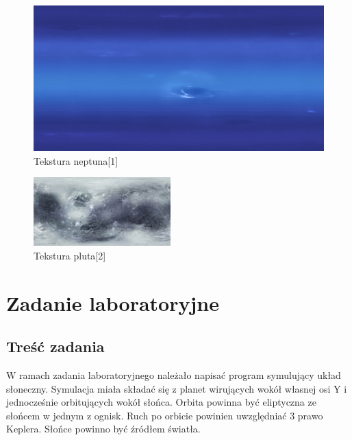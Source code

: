 \documentclass{article}
\begin{document}
        \FloatBarrier
        \begin{figure}[ht]
            \centering
            \includegraphics[width=\textwidth]{images/2k_neptune.jpg}
            \caption{Tekstura neptuna[1]}
            \label{fig:neptune}
        \end{figure}
        \FloatBarrier
        \begin{figure}[ht]
            \centering
            \includegraphics[width=\textwidth]{images/plutomapthumb.jpg}
            \caption{Tekstura pluta[2]}
            \label{fig:pluto}
        \end{figure}
        \FloatBarrier
    \section{Zadanie laboratoryjne}
        \raggedright
        \subsection{Treść zadania}
            W ramach zadania laboratoryjnego należało napisać program symulujący układ słoneczny.
            Symulacja miała składać się z planet wirujących wokół własnej osi Y i jednocześnie 
            orbitujących wokół słońca. Orbita powinna być eliptyczna ze słońcem w jednym z ognisk.
            Ruch po orbicie powinien uwzględniać 3 prawo Keplera. Słońce powinno być źródłem światła.
\end{document}
